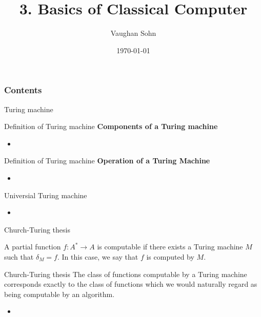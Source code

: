 \documentclass[9pt]{beamer}
\title{3. Basics of Classical Computer}
\date{\today}
\author{Vaughan Sohn}
\begin{document}
    \maketitle
    
    \begin{frame}
        \frametitle{Contents}
        \tableofcontents
    \end{frame}


    \begin{section}{Turing machine}
        \begin{frame}{Definition of Turing machine}
            \textbf{Components of a Turing machine}
            \begin{itemize}
                \item 
            \end{itemize}
        \end{frame}

        \begin{frame}{Definition of Turing machine}
            \textbf{Operation of a Turing Machine}
            \begin{itemize}
                \item 
            \end{itemize}
        \end{frame}

        \begin{frame}{Universial Turing machine}
            \begin{itemize}
                \item 
            \end{itemize}
        \end{frame}

        \begin{frame}{Church-Turing thesis}
            \begin{definition}
                A partial function $f: A^* \rightarrow A$ is computable if there exists a Turing machine $M$ such that $\delta_M = f$. In this case, we say that $f$ is computed by $M$.
            \end{definition}
            \begin{block}{Church-Turing thesis}
                The class of functions computable by a Turing machine corresponds exactly to the class of functions which we would naturally regard as being computable by an algorithm.
            \end{block}
            \begin{itemize}
                \item 
            \end{itemize}
        \end{frame}
        

\end{section}
\end{document}
